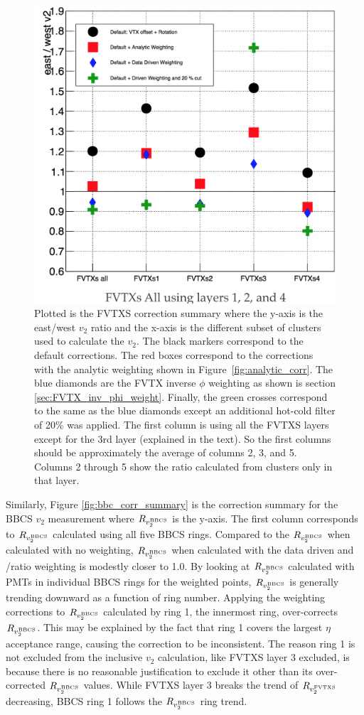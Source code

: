 \begin{figure}[!h]
\begin{center}
\includegraphics[width=0.5\linewidth]{figs/fvtx_correction_summary.png}
\caption{Plotted is the FVTXS correction summary where the y-axis is the east/west $v_2$ ratio and the x-axis is the different subset of clusters used to calculate the $v_2$. The black markers correspond to the default corrections. The red boxes correspond to the corrections with the analytic weighting shown in Figure~\ref{fig:analytic_corr}. The blue diamonds are the FVTX inverse $\phi$ weighting as shown is section \ref{sec:FVTX_inv_phi_weight}. Finally, the green crosses correspond to the same as the blue diamonds except an additional hot-cold filter of 20\% was applied. The first column is using all the FVTXS layers except for the 3rd layer (explained in the text). So the first columns should be approximately the average of columns 2, 3, and 5. Columns 2 through 5 show the ratio calculated from clusters only in that layer.}
\label{fig:fvtx_corr_summary}
\end{center}
\end{figure}

Similarly, Figure \ref{fig:bbc_corr_summary} is the correction summary for the BBCS $v_2$ measurement where $R_{v_2^{\rm BBCS}}$ is the y-axis. The first column corresponds to $R_{v_2^{\rm BBCS}}$ calculated using all five BBCS rings. Compared to the $R_{v_2^{\rm BBCS}}$ when calculated with no weighting, $R_{v_2^{\rm BBCS}}$ when calculated with the data driven and \pp/\pau ratio weighting is modestly closer to 1.0. By looking at $R_{v_2^{\rm BBCS}}$ calculated with PMTs in individual BBCS rings for the weighted points, $R_{v_2^{\rm BBCS}}$ is generally trending downward as a function of ring number. Applying the weighting corrections to $R_{v_2^{\rm BBCS}}$ calculated by ring 1, the innermost ring, over-corrects $R_{v_2^{\rm BBCS}}$. This may be explained by the fact that ring 1 covers the largest $\eta$ acceptance range, causing the correction to be inconsistent. The reason ring 1 is not excluded from the inclusive $v_2$ calculation, like FVTXS layer 3 excluded, is because there is no reasonable justification to exclude it other than its over-corrected $R_{v_2^{\rm BBCS}}$ values. While FVTXS layer 3 breaks the trend of $R_{v_2^{\rm FVTXS}}$ decreasing, BBCS ring 1 follows the $R_{v_2^{\rm BBCS}}$ ring trend.

